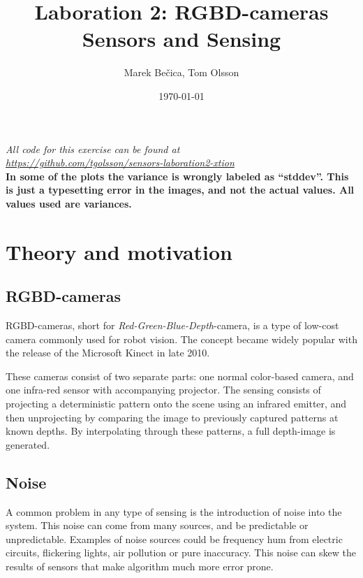 \documentclass[11pt]{article}
\title{Laboration 2: RGBD-cameras\\ {\small Sensors and Sensing}}
\author{Marek Bečica, Tom Olsson}
\date{\today}
\begin{document}
\maketitle %
\begin{center}
  \emph{All code for this exercise can be found at \\ \url{https://github.com/tgolsson/sensors-laboration2-xtion}}\\
  \textbf{\large In some of the plots the variance is wrongly labeled as ``stddev''. This is just a typesetting error in the images, and not the actual values. All values used are variances.}
\end{center}
\tableofcontents
\lstlistoflistings %
\listoffigures %
\listoftables
\lstset{ matchrangestart=t} %
\section{Theory and motivation}


\subsection{RGBD-cameras}
RGBD-cameras, short for \emph{Red-Green-Blue-Depth}-camera, is a type of low-cost camera commonly used for robot vision. The concept became widely popular with the release of the Microsoft Kinect in late 2010. \par

These cameras consist of two separate parts: one normal color-based camera, and one infra-red sensor with accompanying projector. The sensing consists of projecting a deterministic pattern onto the scene using an infrared emitter, and then unprojecting by comparing the image to previously captured patterns at known depths. By interpolating through these patterns, a full depth-image is generated.  


\subsection{Noise}

A common problem in any type of sensing is the introduction of noise into the system. This noise can come from many sources, and be predictable or unpredictable. Examples of noise sources could be frequency hum from electric circuits, flickering lights, air pollution or pure inaccuracy. This noise can skew the results of sensors that make algorithm much more error prone. \par
\end{document}

